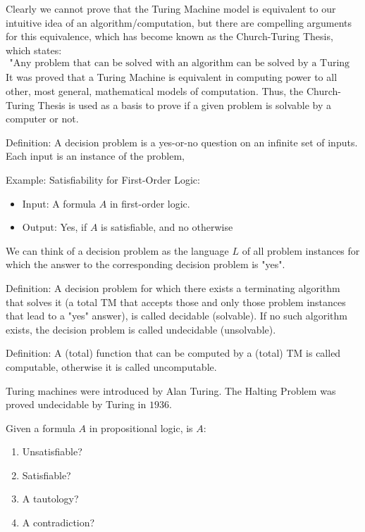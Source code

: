 \documentclass{article}
\begin{document}
Clearly we cannot prove that the Turing Machine model is equivalent to our intuitive idea of an algorithm/computation, but there are compelling arguments for this equivalence, which has become known as the Church-Turing Thesis, which states:
\begin{align*}
\text{"Any problem that can be solved with an algorithm can be solved by a Turing Machine"}
\end{align*}
It was proved that a Turing Machine is equivalent in computing power to all other, most general, mathematical models of computation. Thus, the Church-Turing Thesis is used as a basis to prove if a given problem is solvable by a computer or not.

Definition: A decision problem is a yes-or-no question on an infinite set of inputs. Each input is an instance of the problem,

Example: Satisfiability for First-Order Logic:
\begin{itemize}
    \item Input: A formula $A$ in first-order logic.
    \item Output: Yes, if $A$ is satisfiable, and no otherwise
\end{itemize}

We can think of a decision problem as the language $L$ of all problem instances for which the answer to the corresponding decision problem is "yes". 

Definition: A decision problem for which there exists a terminating algorithm that solves it (a total TM that accepts those and only those problem instances that lead to a "yes" answer), is called decidable (solvable). If no such algorithm exists, the decision problem is called undecidable (unsolvable). 

Definition: A (total) function that can be computed by a (total) TM is called computable, otherwise it is called uncomputable.

Turing machines were introduced by Alan Turing. The Halting Problem was proved undecidable by Turing in $1936$.

Given a formula $A$ in propositional logic, is $A$:
\begin{enumerate}
    \item Unsatisfiable?
    \item Satisfiable?
    \item A tautology?
    \item A contradiction?
\end{enumerate}
\end{document}
